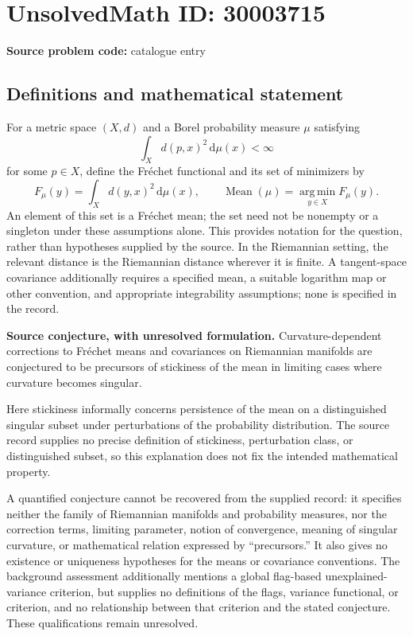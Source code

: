 \documentclass[11pt]{article}
\begin{document}
\section*{UnsolvedMath ID: 30003715}
\textbf{Source problem code:} catalogue entry
\subsection{Definitions and mathematical statement}
For a metric space \((X,d)\) and a Borel probability measure \(\mu\) satisfying
\[
\int_X d(p,x)^2\,\mathrm d\mu(x)<\infty
\]
for some \(p\in X\), define the Fr\'{e}chet functional and its set of minimizers by
\[
F_\mu(y)=\int_X d(y,x)^2\,\mathrm d\mu(x),\qquad
\operatorname{Mean}(\mu)=\operatorname*{arg\,min}_{y\in X}F_\mu(y).
\]
An element of this set is a Fr\'{e}chet mean; the set need not be nonempty or a singleton under these assumptions alone. This provides notation for the question, rather than hypotheses supplied by the source. In the Riemannian setting, the relevant distance is the Riemannian distance wherever it is finite. A tangent-space covariance additionally requires a specified mean, a suitable logarithm map or other convention, and appropriate integrability assumptions; none is specified in the record.

\textbf{Source conjecture, with unresolved formulation.} Curvature-dependent corrections to Fr\'{e}chet means and covariances on Riemannian manifolds are conjectured to be precursors of stickiness of the mean in limiting cases where curvature becomes singular.

Here stickiness informally concerns persistence of the mean on a distinguished singular subset under perturbations of the probability distribution. The source record supplies no precise definition of stickiness, perturbation class, or distinguished subset, so this explanation does not fix the intended mathematical property.

A quantified conjecture cannot be recovered from the supplied record: it specifies neither the family of Riemannian manifolds and probability measures, nor the correction terms, limiting parameter, notion of convergence, meaning of singular curvature, or mathematical relation expressed by ``precursors.'' It also gives no existence or uniqueness hypotheses for the means or covariance conventions. The background assessment additionally mentions a global flag-based unexplained-variance criterion, but supplies no definitions of the flags, variance functional, or criterion, and no relationship between that criterion and the stated conjecture. These qualifications remain unresolved.
\end{document}
